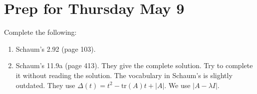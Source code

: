 \documentclass[letterpaper,oneside]{book}%
\theoremstyle{plain}
\theoremstyle{box}
\theoremstyle{problem}
\newtheorem*{hwenum*}{Home Work Practice}
\newenvironment{hw*}[1][]{\begin{hwenum*}[#1]}{\end{hwenum*}\nopagebreak\hrule\bigskip}
\begin{document}
\section{Prep for Thursday May 9}




\begin{hw*}
Complete the following:
\begin{enumerate}
 \item 
Schaum's 2.92 (page 103).
\item
Schaum's 11.9a (page 413). They give the complete solution. Try to complete it without reading the solution. The vocabulary in Schaum's is slightly outdated.  They use $\Delta(t) = t^2-\text{tr}(A)t+|A|$. We use $|A-\lambda I|$.
\end{enumerate}


\end{hw*}
\end{document}
